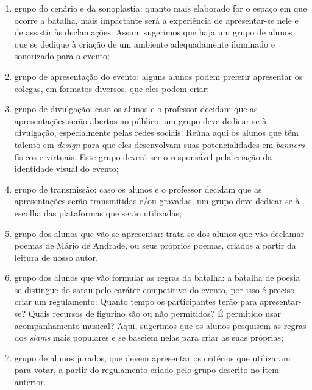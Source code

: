 \documentclass[11pt]{extarticle}
\begin{document}
\begin{enumerate}

\item grupo do cenário e da sonoplastia: quanto mais elaborado for o espaço
em que ocorre a batalha, mais impactante será a experiência de
apresentar-se nele e de assistir às declamações. Assim, sugerimos que
haja um grupo de alunos que se dedique à criação de um ambiente
adequadamente iluminado e sonorizado para o evento;

\item grupo de apresentação do evento: alguns alunos podem preferir
apresentar os colegas, em formatos diversos, que eles podem criar;

\item grupo de divulgação: caso os alunos e o professor decidam que as
apresentações serão abertas ao público, um grupo deve dedicar-se à
divulgação, especialmente pelas redes sociais. Reúna aqui os alunos que
têm talento em \emph{design} para que eles desenvolvam suas
potencialidades em \emph{banners} físicos e virtuais. Este grupo deverá
ser o responsável pela criação da identidade visual do evento;

\item grupo de transmissão: caso os alunos e o professor decidam que as
apresentações serão transmitidas e/ou gravadas, um grupo deve dedicar-se
à escolha das plataformas que serão utilizadas;

\item grupo dos alunos que vão se apresentar: trata-se dos alunos que vão
declamar poemas de Mário de Andrade, ou seus próprios poemas, criados a
partir da leitura de nosso autor.

\item grupo dos alunos que vão formular as regras da batalha: a batalha de
poesia se distingue do sarau pelo caráter competitivo do evento, por
isso é preciso criar um regulamento: Quanto tempo os participantes terão
para apresentar-se? Quais recursos de figurino são ou não permitidos? É
permitido usar acompanhamento musical? Aqui, sugerimos que os alunos
pesquisem as regras dos \emph{slams} mais populares e se baseiem nelas
para criar as suas próprias;

\item grupo de alunos jurados, que devem apresentar os critérios que
utilizaram para votar, a partir do regulamento criado pelo grupo
descrito no item anterior.



\end{enumerate}
\end{document}
